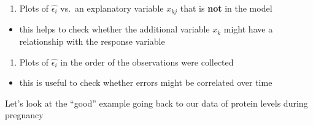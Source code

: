 \documentclass[
]{book}
\newenvironment{Shaded}{\begin{snugshade}}{\end{snugshade}}
\newcommand{\CommentTok}[1]{\textcolor[rgb]{0.56,0.35,0.01}{\textit{#1}}}
\newcommand{\DataTypeTok}[1]{\textcolor[rgb]{0.13,0.29,0.53}{#1}}
\newcommand{\DecValTok}[1]{\textcolor[rgb]{0.00,0.00,0.81}{#1}}
\newcommand{\KeywordTok}[1]{\textcolor[rgb]{0.13,0.29,0.53}{\textbf{#1}}}
\newcommand{\NormalTok}[1]{#1}
\newcommand{\OperatorTok}[1]{\textcolor[rgb]{0.81,0.36,0.00}{\textbf{#1}}}
\newcommand{\StringTok}[1]{\textcolor[rgb]{0.31,0.60,0.02}{#1}}
\providecommand{\tightlist}{%
  \setlength{\itemsep}{0pt}\setlength{\parskip}{0pt}}
\theoremstyle{definition}
\theoremstyle{definition}
\theoremstyle{definition}
\theoremstyle{remark}
\begin{document}
\begin{enumerate}
\def\labelenumi{\arabic{enumi}.}
\setcounter{enumi}{3}
\tightlist
\item
  Plots of \(\hat{\epsilon_i}\) vs.~an explanatory variable \(x_{kj}\) that is \textbf{not} in the model
\end{enumerate}

\begin{itemize}
\tightlist
\item
  this helps to check whether the additional variable \(x_k\) might have a relationship with the response variable
\end{itemize}

\begin{enumerate}
\def\labelenumi{\arabic{enumi}.}
\setcounter{enumi}{3}
\tightlist
\item
  Plots of \(\hat{\epsilon_i}\) in the order of the observations were collected
\end{enumerate}

\begin{itemize}
\tightlist
\item
  this is useful to check whether errors might be correlated over time
\end{itemize}

Let's look at the ``good'' example going back to our data of protein levels during pregnancy

\begin{Shaded}
\end{Shaded}
\end{document}
